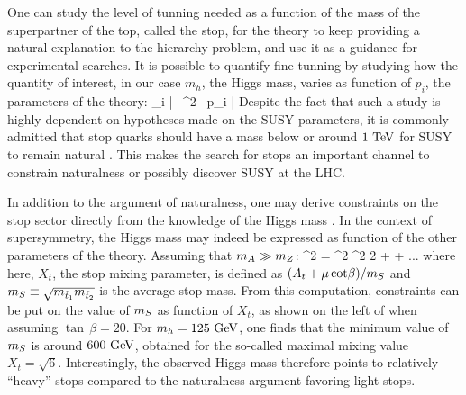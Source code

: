     One can study the level of tunning needed as a function of the mass of the
    superpartner of the top, called the stop, for the theory to keep providing a
    natural explanation to the hierarchy problem, and use it as a guidance for
    experimental searches. It is possible to quantify fine-tunning by studying
    how the quantity of interest, in our case $m_h$, the Higgs mass, varies as
    function of $p_i$, the parameters of the theory:
    {
        \Delta {}
        _i
        \left|
             \frac
             {\partial {}\, ^2}
             {\partial {}\, p_i}
        \right|
    }
    Despite the fact that such a study is highly dependent on hypotheses made on
    the SUSY parameters, it is commonly admitted that stop quarks should have a
    mass below or around $1~\text{TeV}$ for SUSY to remain natural
    \cite{TheMoreMinimalSSM, NaturalSusyEndures,
    ANaturalSUSYHiggs,NaturalSUSYAndDarkMatter}. This makes the search for stops
    an important channel to constrain naturalness or possibly discover SUSY at
    the LHC.

    In addition to the argument of naturalness, one may derive constraints on
    the stop sector directly from the knowledge of the Higgs mass
    \cite{TheLightStopWindow}. In the context of supersymmetry, the Higgs mass
    may indeed be expressed as function of the other parameters of the theory.
    Assuming that $m_{A} \gg m_{Z}$:
    {
        ^2
        =
        ^2 ^2 2\beta
        +
        + ...
    }
    where here, $X_t$, the stop mixing parameter, is defined as $(A_t + \mu\,
    \text{cot} \beta) / m_{S}$ and $m_{S} \equiv
    \sqrt{m_{\tilde{t}_1}m_{\tilde{t}_2}}$ is the average stop mass. From
    this computation, constraints can be put on the value of $m_{S}$ as
    function of $X_t$, as shown on the left of
     when assuming $\tan\, \beta = 20$. For
    $m_{h}= 125~\text{GeV}$, one finds that the minimum value of $m_{S}$ is
    around $600~\text{GeV}$, obtained for the so-called maximal mixing value $X_t =
    \sqrt{6}$.  Interestingly, the observed Higgs mass therefore points to
    relatively ``heavy'' stops compared to the naturalness argument favoring
    light stops.

